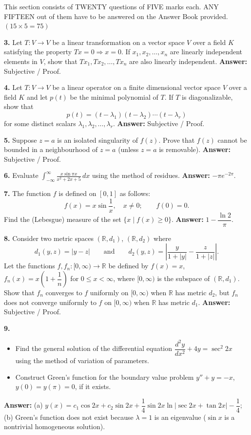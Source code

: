 \documentclass[11pt,a4paper]{article}
\newcommand{\ans}[1]{\textbf{Answer:} #1\par\medskip}
\begin{document}
This section consists of TWENTY questions of FIVE marks each. ANY FIFTEEN out of them have to be answered on the Answer Book provided. \hfill $(15 \times 5 = 75)$

\medskip

\textbf{3.} Let $T : V \to V$ be a linear transformation on a vector space $V$ over a field $K$ satisfying the property $Tx = 0 \Rightarrow x = 0$. If $x_1, x_2, \dots, x_n$ are linearly independent elements in $V$, show that $Tx_1, Tx_2, \dots, Tx_n$ are also linearly independent.
\ans{Subjective / Proof.}

\textbf{4.} Let $T : V \to V$ be a linear operator on a finite dimensional vector space $V$ over a field $K$ and let $p(t)$ be the minimal polynomial of $T$. If $T$ is diagonalizable, show that
\[
  p(t) = (t - \lambda_1)(t - \lambda_2)\cdots(t - \lambda_r)
\]
for some distinct scalars $\lambda_1, \lambda_2, \dots, \lambda_r$.
\ans{Subjective / Proof.}

\textbf{5.} Suppose $z = a$ is an isolated singularity of $f(z)$. Prove that $f(z)$ cannot be bounded in a neighbourhood of $z = a$ (unless $z = a$ is removable).
\ans{Subjective / Proof.}

\textbf{6.} Evaluate $\displaystyle\int_{-\infty}^{\infty} \frac{x\sin\pi x}{x^2 + 2x + 5}\,dx$ using the method of residues.
\ans{$-\pi e^{-2\pi}$.}

\textbf{7.} The function $f$ is defined on $[0, 1]$ as follows:
\[
  f(x) = x\sin\frac{1}{x}, \quad x \ne 0; \qquad f(0) = 0.
\]
Find the (Lebesgue) measure of the set $\{x \mid f(x) \ge 0\}$.
\ans{$1 - \dfrac{\ln 2}{\pi}$.}

\textbf{8.} Consider two metric spaces $(\mathbb{R}, d_1)$, $(\mathbb{R}, d_2)$ where
\[
  d_1(y, z) = |y - z| \qquad \text{and} \qquad d_2(y, z) = \left|\frac{y}{1 + |y|} - \frac{z}{1 + |z|}\right|.
\]
Let the functions $f, f_n : [0, \infty) \to \mathbb{R}$ be defined by $f(x) = x$, $f_n(x) = x\!\left(1 + \dfrac{1}{n}\right)$ for $0 \le x < \infty$, where $[0, \infty)$ is the subspace of $(\mathbb{R}, d_1)$. Show that $f_n$ converges to $f$ uniformly on $[0, \infty)$ when $\mathbb{R}$ has metric $d_2$, but $f_n$ does not converge uniformly to $f$ on $[0, \infty)$ when $\mathbb{R}$ has metric $d_1$.
\ans{Subjective / Proof.}

\textbf{9.}
\begin{itemize}
  \setlength{\itemsep}{3pt}\setlength{\parskip}{0pt}
  \item[(a)] Find the general solution of the differential equation $\dfrac{d^2y}{dx^2} + 4y = \sec^2 2x$ using the method of variation of parameters.
  \item[(b)] Construct Green's function for the boundary value problem $y'' + y = -x$, $y(0) = y(\pi) = 0$, if it exists.
\end{itemize}
\ans{(a) $y(x) = c_1\cos 2x + c_2\sin 2x + \dfrac{1}{4}\sin 2x\ln|\sec 2x + \tan 2x| - \dfrac{1}{4}$; \quad (b) Green's function does not exist because $\lambda = 1$ is an eigenvalue ($\sin x$ is a nontrivial homogeneous solution).}
\end{document}

